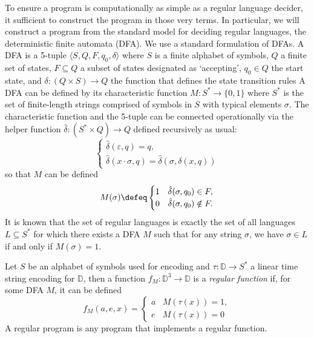 \documentclass[runningheads]{llncs}
\newcommand{\Domain}{\mathbb{D}}
\begin{document}
To ensure a program is computationally as simple as a regular language decider, it sufficient to
construct the program in those very terms. In particular, we will construct a program from the
standard model for deciding regular languages, the deterministic finite automata (DFA). 
%
We use a standard formulation of DFAs. A DFA is a 5-tuple \(\langle S,Q,F,q_0,\delta\rangle\)
where \( S\) is a finite alphabet of symbols, \(Q\) a finite set of states, \(F \subseteq Q\) a
subset of states designated as `accepting', \(q_0 \in Q\) the start state, and 
\(\delta: (Q \times  S) \to Q\) the function that defines the state transition rules
A DFA can be defined by its characteristic function \(M:  S^* \to \{0,1\}\) where \( S^*\) is
the set of finite-length strings comprised of symbols in \( S\) with typical elements $\sigma$. The characteristic function and
the 5-tuple can be connected operationally via the helper function \(\hat{\delta}: ( S^* \times Q) \to Q\) defined recursively as usual:
\[
    \begin{cases}
        \hat{\delta}(\varepsilon, q) = q,\\
        \hat{\delta}(x \cdot \sigma, q) = \hat{\delta}(\sigma, \delta(x, q))
    \end{cases}
\]
so that \(M\) can be defined
\[
    M(\sigma) \defeq \begin{cases}
        1 & \hat{\delta}(\sigma, q_0) \in F,\\
        0 & \hat{\delta}(\sigma, q_0) \notin F.
    \end{cases}
\]
It is known that the set of regular languages is exactly the set of all languages \(L\subseteq S^*\) for which there exists
a DFA \(M\) such that for any string \(\sigma\), we have \(\sigma \in L\) if and only if \(M(\sigma) = 1\).

Let \(S\) be an alphabet of symbols used for encoding and \(\tau: \Domain \to  S^*\) a linear time string
encoding for $\Domain$, then a function \(f_M: \Domain^3 \to \Domain\) is a {\em regular function\/} if, for some DFA \(M\), it can be defined 
\[
    f_{M}(a,e,x) = \begin{cases}
        a & M(\tau(x)) = 1,\\
        e & M(\tau(x)) = 0
    \end{cases}
\]
A regular program is any program that implements a regular function.
\end{document}

